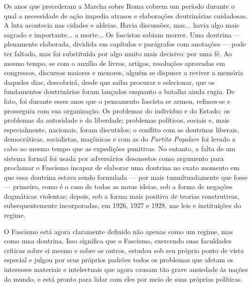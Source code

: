 \documentclass[12pt]{article}
\begin{document}
Os anos que precederam a Marcha sobre Roma cobrem um período durante o qual a necessidade de ação impedia atrasos e elaborações doutrinárias cuidadosas. A luta acontecia nas cidades e aldeias. Havia discussões, mas... havia algo mais sagrado e importante... a morte... Os fascistas sabiam morrer. Uma doutrina — plenamente elaborada, dividida em capítulos e parágrafos com anotações — pode ter faltado, mas foi substituída por algo muito mais decisivo: por uma fé. Ao mesmo tempo, se com o auxílio de livros, artigos, resoluções aprovadas em congressos, discursos maiores e menores, alguém se dispuser a reviver a memória daqueles dias, descobrirá, desde que saiba procurar e selecionar, que os fundamentos doutrinários foram lançados enquanto a batalha ainda rugia. De fato, foi durante esses anos que o pensamento fascista se armou, refinou-se e prosseguiu com sua organização. Os problemas do indivíduo e do Estado; os problemas da autoridade e da liberdade; problemas políticos, sociais e, mais especialmente, nacionais, foram discutidos; o conflito com as doutrinas liberais, democráticas, socialistas, maçônicas e com as do \textit{Partito Popolare} foi levado a cabo ao mesmo tempo que as expedições punitivas. No entanto, a falta de um sistema formal foi usada por adversários desonestos como argumento para proclamar o Fascismo incapaz de elaborar uma doutrina no exato momento em que essa doutrina estava sendo formulada — por mais tumultuadamente que fosse — primeiro, como é o caso de todas as novas ideias, sob a forma de negações dogmáticas violentas; depois, sob a forma mais positiva de teorias construtivas, subsequentemente incorporadas, em 1926, 1927 e 1928, nas leis e instituições do regime.

O Fascismo está agora claramente definido não apenas como um regime, mas como uma doutrina. Isso significa que o Fascismo, exercendo suas faculdades críticas sobre si mesmo e sobre os outros, estudou sob seu próprio ponto de vista especial e julgou por seus próprios padrões todos os problemas que afetam os interesses materiais e intelectuais que agora causam tão grave ansiedade às nações do mundo, e está pronto para lidar com eles por meio de suas próprias políticas.
\end{document}
